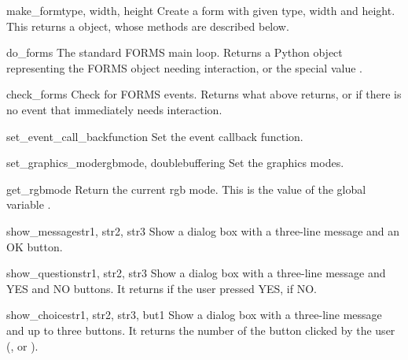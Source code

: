 \begin{funcdesc}{make_form}{type, width, height}
Create a form with given type, width and height.  This returns a
 object, whose methods are described below.
\end{funcdesc}

\begin{funcdesc}{do_forms}{}
The standard FORMS main loop.  Returns a Python object representing
the FORMS object needing interaction, or the special value
.
\end{funcdesc}

\begin{funcdesc}{check_forms}{}
Check for FORMS events.  Returns what  above
returns, or  if there is no event that immediately needs
interaction.
\end{funcdesc}

\begin{funcdesc}{set_event_call_back}{function}
Set the event callback function.
\end{funcdesc}

\begin{funcdesc}{set_graphics_mode}{rgbmode, doublebuffering}
Set the graphics modes.
\end{funcdesc}

\begin{funcdesc}{get_rgbmode}{}
Return the current rgb mode.  This is the value of the \C{} global
variable .
\end{funcdesc}

\begin{funcdesc}{show_message}{str1, str2, str3}
Show a dialog box with a three-line message and an OK button.
\end{funcdesc}

\begin{funcdesc}{show_question}{str1, str2, str3}
Show a dialog box with a three-line message and YES and NO buttons.
It returns  if the user pressed YES,  if NO.
\end{funcdesc}

\begin{funcdesc}{show_choice}{str1, str2, str3, but1}
Show a dialog box with a three-line message and up to three buttons.
It returns the number of the button clicked by the user
(,  or ).
\end{funcdesc}

